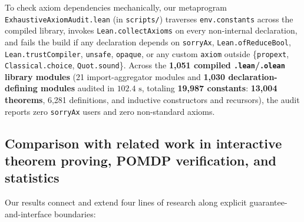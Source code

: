 \documentclass[11pt,a4paper]{article}
\begin{document}
To check axiom dependencies mechanically, our metaprogram
\texttt{ExhaustiveAxiomAudit.lean} (in \texttt{scripts/}) traverses
\texttt{env.constants} across the compiled library, invokes
\texttt{Lean.collectAxioms} on every non-internal declaration, and fails
the build if any declaration depends on \texttt{sorryAx},
\texttt{Lean.ofReduceBool}, \texttt{Lean.trustCompiler},
\texttt{unsafe}, \texttt{opaque}, or any custom \texttt{axiom} outside
\{\texttt{propext}, \texttt{Classical.choice}, \texttt{Quot.sound}\}.
Across the \textbf{1,051 compiled \texttt{.lean}/\texttt{.olean} library
modules} (21 import-aggregator modules and \textbf{1,030
declaration-defining modules} audited in \textbf{\(102.4\text{ s}\)},
totaling \textbf{19,987 constants}: \textbf{13,004 theorems}, 6,281
definitions, and inductive constructors and recursors), the audit
reports zero \texttt{sorryAx} users and zero non-standard axioms.

\subsection{Comparison with related work in interactive theorem proving,
POMDP verification, and
statistics}\label{comparison-with-related-work-in-interactive-theorem-proving-pomdp-verification-and-statistics}

Our results connect and extend four lines of research along explicit
guarantee-and-interface boundaries:
\end{document}
